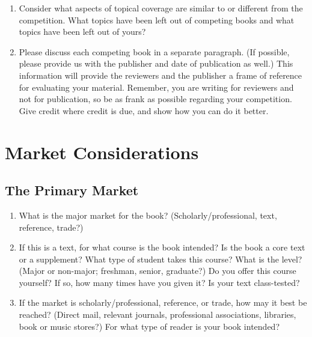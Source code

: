\documentclass[
  10pt,
  dvipsnames,enabledeprecatedfontcommands]{scrartcl}
\begin{document}
\begin{enumerate}
\def\labelenumi{\alph{enumi}.}
\setcounter{enumi}{1}
\item
  Consider what aspects of topical coverage are similar to or different
  from the competition. What topics have been left out of competing
  books and what topics have been left out of yours?
\item
  Please discuss each competing book in a separate paragraph. (If
  possible, please provide us with the publisher and date of publication
  as well.) This information will provide the reviewers and the
  publisher a frame of reference for evaluating your material. Remember,
  you are writing for reviewers and not for publication, so be as frank
  as possible regarding your competition. Give credit where credit is
  due, and show how you can do it better.
\end{enumerate}

\hypertarget{market-considerations}{%
\section{Market Considerations}\label{market-considerations}}

\hypertarget{the-primary-market}{%
\subsection{The Primary Market}\label{the-primary-market}}

\footnotesize

\begin{enumerate}
\def\labelenumi{\arabic{enumi}.}
\item
  What is the major market for the book? (Scholarly/professional, text,
  reference, trade?)
\item
  If this is a text, for what course is the book intended? Is the book a
  core text or a supplement? What type of student takes this course?
  What is the level? (Major or non-major; freshman, senior, graduate?)
  Do you offer this course yourself? If so, how many times have you
  given it? Is your text class-tested?
\item
  If the market is scholarly/professional, reference, or trade, how may
  it best be reached? (Direct mail, relevant journals, professional
  associations, libraries, book or music stores?) For what type of
  reader is your book intended?
\end{enumerate}

\normalsize
\end{document}
